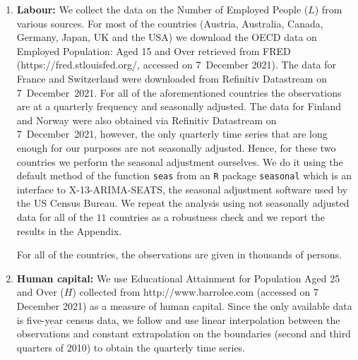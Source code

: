 \documentclass[a4paper,12pt]{article}
\begin{document}
\begin{enumerate}
\item \textbf{Labour:} We collect the data on the Number of Employed People ($L$) from various sources. For most of the countries (Austria, Australia, Canada, Germany, Japan, UK and the USA) we download the OECD data on Employed Population: Aged 15 and Over retrieved from FRED (https://fred.stlouisfed.org/, accessed on 7~December 2021). \nocite{OECDempl} The data for France and Switzerland were downloaded from Refinitiv Datastream on 7~December~2021. For all of the aforementioned countries the observations are at a quarterly frequency and seasonally adjusted. The data for Finland and Norway were also obtained via Refinitiv Datastream on 7~December~2021, however, the only quarterly time series that are long enough for our purposes are not seasonally adjusted. Hence, for these two countries we perform the seasonal adjustment ourselves. We do it using the default method of the function \verb|seas| from an \verb|R| package \verb|seasonal| \citep*{Sax2018} which is an interface to X-13-ARIMA-SEATS, the seasonal adjustment software used by the US Census Bureau. We repeat the analysis using not seasonally adjusted data for all of the $11$ countries as a robustness check and we report the results in the Appendix.

For all of the countries, the observations are given in thousands of persons.
\item \textbf{Human capital:} We use Educational Attainment for Population Aged 25 and Over ($H$) collected from http://www.barrolee.com (accessed on 7 December 2021) as a measure of human capital. Since the only available data is five-year census data, we follow \cite{Zhang2012} and use linear interpolation between the observations and constant extrapolation on the boundaries (second and third quarters of 2010) to obtain the quarterly time series.
\end{enumerate}
\end{document}

